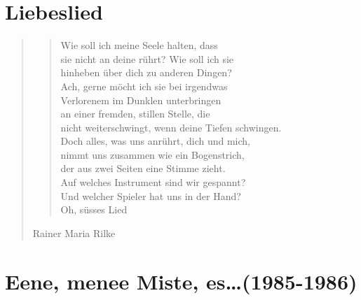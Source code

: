 \documentclass[10pt,titlepage,a5paper]{book}
\newenvironment{tg}{\begin{quote}\em}{\end{quote}}
\newenvironment{dichter}{\begin{flushright}}{\end{flushright}}
\begin{document}
\section*{Liebeslied}


\begin{tg}
\begin{verse}
Wie soll ich meine Seele halten, dass\\
sie nicht an deine rührt? Wie soll ich sie\\
hinheben über dich zu anderen Dingen?\\
Ach, gerne möcht ich sie bei irgendwas\\
Verlorenem im Dunklen unterbringen\\
an einer fremden, stillen Stelle, die\\
nicht weiterschwingt, wenn deine Tiefen schwingen.\\
Doch alles, was uns anrührt, dich und mich,\\
nimmt uns zusammen wie ein Bogenstrich,\\
der aus zwei Seiten eine Stimme zieht.\\
Auf welches Instrument sind wir gespannt?\\
Und welcher Spieler hat uns in der Hand?\\
Oh, süsses Lied
\end{verse}
\begin{dichter}Rainer Maria Rilke\end{dichter}
\end{tg}

\section*{Eene, menee Miste, es\dots (1985-1986)}
\end{document}
